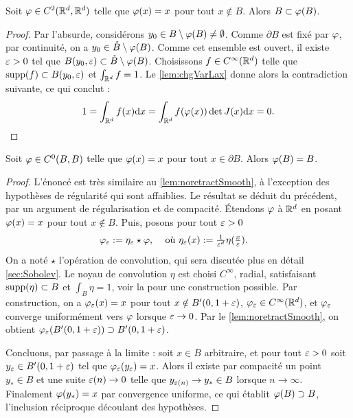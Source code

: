 \begin{lemma}
\label{lem:noretractSmooth}
%
	Soit $\varphi \in C^2(\mathbb{R}^d, \mathbb{R}^d)$ telle que $\varphi(x) = x$ pour tout $x \notin B$. Alors $B \subset \varphi(B)$.
\end{lemma}

\begin{proof}
	Par l'absurde, considérons $y_0 \in B \setminus \varphi(B) \neq \emptyset$. Comme $\partial B$ est fixé par $\varphi$, par continuité, on a $y_0 \in \mathring B \setminus \varphi(B)$. Comme cet ensemble est ouvert, il existe $\varepsilon>0$ tel que $B(y_0, \varepsilon) \subset \mathring B \setminus \varphi(B)$. 
	Choisissons $f\in C^\infty(\mathbb{R}^d)$ telle que $\operatorname{supp}(f) \subset B(y_0,\varepsilon)$ et $\int_{\mathbb{R}^d} f = 1$.
	Le \cref{lem:chgVarLax} donne alors la contradiction suivante, ce qui conclut : 
	\begin{equation*}
		1 = \int_{\mathbb{R}^d} f(x) \mathrm{d} x = \int_{\mathbb{R}^d} f(\varphi(x)) \det J(x) \mathrm{d} x = 0.
		\qedhere
	\end{equation*} 
\end{proof}

\begin{corollary}
\label{corol:noretract}
%
	Soit $\varphi\in C^0(B,B)$ telle que $\varphi(x) = x$ pour tout $x\in \partial B$. 
	Alors $\varphi(B) = B$. 
\end{corollary}

\begin{proof}
L'énoncé est très similaire au \cref{lem:noretractSmooth}, à l'exception des hypothèses de régularité qui sont affaiblies. Le résultat se déduit du précédent, par un argument de régularisation et de compacité. 
	Étendons $\varphi$ à $\mathbb{R}^d$ en posant $\varphi(x) = x$ pour tout $x \notin B$. 
	Puis, posons pour tout $\varepsilon>0$
	\begin{align*}
		\varphi_\varepsilon &:= \eta_\varepsilon \star \varphi,&
		\text{ où }
		\eta_\varepsilon(x) &:= \tfrac{1}{\varepsilon^d} \eta(\tfrac{x}{\varepsilon}).
	\end{align*}
	On a noté $\star$ l'opération de convolution, qui sera discutée plus en détail \cref{sec:Sobolev}. Le noyau de convolution $\eta$ est choisi $C^\infty$, radial, satisfaisant $\operatorname{supp}(\eta) \subset B$ et $\int_B \eta = 1$, voir la  pour une construction possible. 
	Par construction, on a $\varphi_\varepsilon(x) = x$ pour tout $x \notin B'(0,1+\varepsilon)$, $\varphi_\varepsilon \in C^\infty(\mathbb{R}^d)$, et $\varphi_\varepsilon$ converge uniformément vers $\varphi$ lorsque $\varepsilon \to 0$. 
	Par le \cref{lem:noretractSmooth}, on obtient $\varphi_\varepsilon(B'(0,1+\varepsilon)) \supset B'(0,1+\varepsilon)$. 
	
	Concluons, par passage à la limite : soit $x \in B$ arbitraire, et pour tout $\varepsilon>0$ soit $y_\varepsilon \in B'(0,1+\varepsilon)$ tel que $\varphi_\varepsilon(y_\varepsilon) = x$. Alors il existe par compacité un point $y_* \in B$ et une suite $\varepsilon(n) \to 0$ telle que $y_{\varepsilon(n)} \to y_* \in B$ lorsque $n \to \infty$. Finalement $\varphi(y_*) = x$ par convergence uniforme, ce qui  établit $\varphi(B) \supset B$, l'inclusion réciproque découlant des hypothèses. 
\end{proof}

